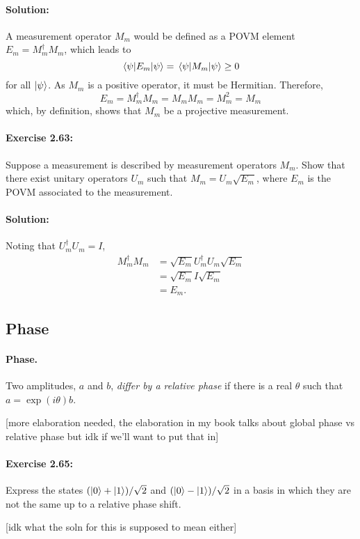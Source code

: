 \paragraph{Solution:} A measurement operator $M_m$ would be defined as a
POVM element $E_m = M_m^{\dagger}M_m$, which leads to \begin{equation*}
  \mel{\psi}{E_m}{\psi} = \mel{\psi}{M_m}{\psi} \geq 0
\end{equation*} for all $\ket{\psi}$. As $M_m$ is a positive operator, it must
be Hermitian. Therefore, \begin{equation*}
  E_m = M_m^{\dagger}M_m = M_mM_m = M_m^2 = M_m
\end{equation*} which, by definition, shows that $M_m$ be a projective
measurement.

\paragraph{\cite{mikeandike} Exercise 2.63:} Suppose a measurement is described
by measurement operators $M_m$. Show that there exist unitary operators $U_m$
such that $M_m = U_m\sqrt{E_m}$, where $E_m$ is the POVM associated to the
measurement.

\paragraph{Solution:} Noting that $U_m^{\dagger}U_m = I$, \begin{align*}
  M_m^{\dagger}M_m &= \sqrt{E_m}U_m^{\dagger}U_m\sqrt{E_m} \\
    &= \sqrt{E_m}I\sqrt{E_m} \\
    &= E_m.
\end{align*}

\subsection{Phase}

\paragraph{Phase.} Two amplitudes, $a$ and $b$, \emph{differ by a relative
phase} if there is a real $\theta$ such that $a = \exp(i\theta)b$.

[more elaboration needed, the elaboration in my book talks about global phase
vs relative phase but idk if we'll want to put that in]

\paragraph{\cite{mikeandike} Exercise 2.65:} Express the states $(\ket{0} +
\ket{1})/\sqrt{2}$ and $(\ket{0} - \ket{1})/\sqrt{2}$ in a basis in which they
are not the same up to a relative phase shift.

[idk what the soln for this is supposed to mean either]

